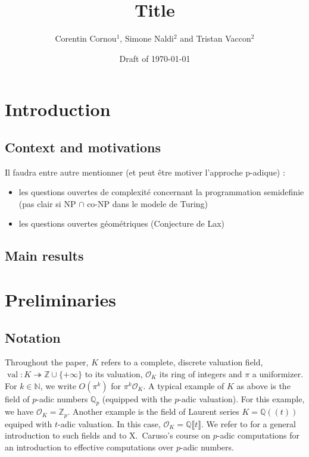 \documentclass[a4paper,12pt]{article}
\title{\bf Title}
\newcommand{\N}{\mathbb{N}} %
\DeclareMathOperator{\val}{val}
\def\QQ{\ensuremath{\mathbb{Q}}}
\def\ZZ{\ensuremath{\mathbb{Z}}}
\newcommand{\OK}{\mathcal{O}_K}
\begin{document}
\author{Corentin Cornou$^{1}$, Simone Naldi$^2$ and Tristan Vaccon$^2$}


\date{Draft of \today}

\maketitle

\begin{abstract}
\end{abstract}


\tableofcontents


\section{Introduction}

\subsection{Context and motivations}

Il faudra entre autre mentionner (et peut être motiver l'approche p-adique) :
\begin{itemize}
\item les questions ouvertes de complexité concernant la programmation semidefinie (pas clair si NP $\cap$ co-NP
  dans le modele de Turing)
\item les questions ouvertes géométriques (Conjecture de Lax)
\end{itemize}


\subsection{Main results}



\section{Preliminaries}

\subsection{Notation}

Throughout the paper, $K$ refers to a complete,
discrete valuation field, $\val : K \twoheadrightarrow \ZZ \cup \{+\infty\}$ to its valuation,
$\OK$ its ring of integers and $\pi$ a uniformizer.
For $k \in \N$, we write $O(\pi^k)$ for $\pi^k \OK.$
A typical example of $K$ as above is the field of $p$-adic numbers 
$\QQ_p$ (equipped with the $p$-adic valuation). For this example, we 
have $\OK = \ZZ_p$.
Another example is the field of Laurent series
$K=\QQ(\!(t)\!)$ equiped with $t$-adic valuation.
In this case, $\OK = \QQ \llbracket t \rrbracket$.
We refer to \cite{Serre:1979} for a
general introduction to such fields
and to X.~Caruso's course on $p$-adic computations \cite{caruso_computations_2017}
for an introduction to effective computations over $p$-adic numbers.
\end{document}
